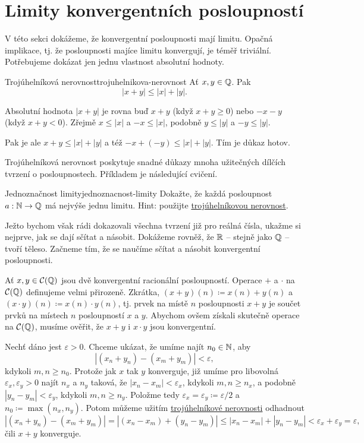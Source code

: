 \section{Limity konvergentních posloupností}
\label{sec:limity-konvergentnich-posloupnosti}

V této sekci dokážeme, že konvergentní posloupnosti mají limitu. Opačná
implikace, tj. že posloupnosti majíce limitu konvergují, je téměř triviální.
Potřebujeme dokázat jen jednu vlastnost absolutní hodnoty.

\begin{lemma}{Trojúhelníková nerovnost}{trojuhelnikova-nerovnost}
 Ať $x,y \in \mathbb{Q}$. Pak
 \[
  |x + y| \leq |x| + |y|.
 \]
\end{lemma}
\begin{lemproof}
 Absolutní hodnota $|x+y|$ je rovna buď $x + y$ (když $x+y \geq 0$) nebo $-x-y$
 (když $x+y<0$). Zřejmě $x \leq |x|$ a $-x \leq |x|$, podobně $y \leq |y|$ a
 $-y \leq |y|$.

 Pak je ale $x + y \leq |x| + |y|$ a též $-x+(-y) \leq |x| + |y|$. Tím je důkaz
 hotov.
\end{lemproof}

Trojúhelníková nerovnost poskytuje snadné důkazy mnoha užitečných dílčích
tvrzení o posloupnostech. Příkladem je následující cvičení.

\begin{exercise}{Jednoznačnost limity}{jednoznacnost-limity}
 Dokažte, že každá posloupnost $a:\mathbb{N} \to \mathbb{Q}$ má nejvýše jednu limitu. Hint:
 použijte \hyperref[lem:trojuhelnikova-nerovnost]{trojúhelníkovou nerovnost}.
\end{exercise}

Ježto bychom však rádi dokazovali všechna tvrzení již pro reálná čísla, ukažme
si nejprve, jak se dají sčítat a násobit. Dokážeme rovněž, že $\mathbb{R}$ -- stejně
jako $\mathbb{Q}$ -- tvoří těleso. Začneme tím, že se naučíme sčítat a násobit
konvergentní posloupnosti.

Ať $x,y \in \mathcal{C}(\mathbb{Q})$ jsou dvě konvergentní racionální posloupností.
Operace $+$ a $ \cdot $ na $\mathcal{C}(\mathbb{Q})$ definujeme velmi přirozeně.
Zkrátka, $(x+y)(n) \coloneqq x(n) + y(n)$ a $(x \cdot y)(n) \coloneqq x(n) \cdot
y(n)$, tj. prvek na místě $n$ posloupnosti $x+y$ je součet prvků na místech $n$
posloupností $x$ a $y$. Abychom ovšem získali skutečně operace na
$\mathcal{C}(\mathbb{Q})$, musíme ověřit, že $x+y$ i $x \cdot y$ jsou konvergentní.

Nechť dáno jest $\varepsilon>0$. Chceme ukázat, že umíme najít $n_0 \in \mathbb{N}$, aby
\[
 |(x_n + y_n) - (x_m + y_m)| < \varepsilon,
\]
kdykoli $m,n \geq n_0$. Protože jak $x$ tak $y$ konverguje, již umíme pro
libovolná $\varepsilon_x,\varepsilon_y>0$ najít $n_x$ a $n_y$ taková, že $|x_n -
x_m| < \varepsilon_x$, kdykoli $m,n \geq n_x$, a podobně $|y_n -
y_m|<\varepsilon_y$, kdykoli $m,n \geq n_y$. Položme tedy $\varepsilon_x =
\varepsilon_y \coloneqq \varepsilon / 2$ a $n_0 \coloneqq \max(n_x,n_y)$. Potom
můžeme užitím \hyperref[lem:trojuhelnikova-nerovnost]{trojúhelníkové nerovnosti}
odhadnout
\[
 |(x_n + y_n) - (x_m + y_m)| = |(x_n - x_m) + (y_n - y_m)| \leq |x_n - x_m| +
 |y_n - y_m| < \varepsilon_x + \varepsilon_y = \varepsilon,
\]
čili $x + y$ konverguje.

